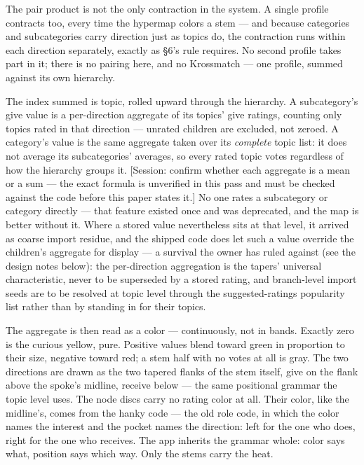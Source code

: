 The pair product is not the only contraction in the system. A single
profile contracts too, every time the hypermap colors a stem --- and
because categories and subcategories carry direction just as topics do,
the contraction runs within each direction separately, exactly as \S 6's
rule requires. No second profile takes part in it; there is no pairing
here, and no Krossmatch --- one profile, summed against its own
hierarchy.

The index summed is topic, rolled upward through the hierarchy. A
subcategory's give value is a per-direction aggregate of its topics'
give ratings, counting only topics rated in that direction --- unrated
children are excluded, not zeroed. A category's value is the same
aggregate taken over its \emph{complete} topic list: it does not average
its subcategories' averages, so every rated topic votes regardless of
how the hierarchy groups it. {[}Session: confirm whether each aggregate
is a mean or a sum --- the exact formula is unverified in this pass and
must be checked against the code before this paper states it.{]} No one
rates a subcategory or category directly --- that feature existed once
and was deprecated, and the map is better without it. Where a stored
value nevertheless sits at that level, it arrived as coarse import
residue, and the shipped code does let such a value override the
children's aggregate for display --- a survival the owner has ruled
against (see the design notes below): the per-direction aggregation is
the tapers' universal characteristic, never to be superseded by a stored
rating, and branch-level import seeds are to be resolved at topic level
through the suggested-ratings popularity list rather than by standing in
for their topics.

The aggregate is then read as a color --- continuously, not in bands.
Exactly zero is the curious yellow, pure. Positive values blend toward
green in proportion to their size, negative toward red; a stem half with
no votes at all is gray. The two directions are drawn as the two tapered
flanks of the stem itself, give on the flank above the spoke's midline,
receive below --- the same positional grammar the topic level uses. The
node discs carry no rating color at all. Their color, like the
midline's, comes from the hanky code --- the old role code, in which the
color names the interest and the pocket names the direction: left for
the one who does, right for the one who receives. The app inherits the
grammar whole: color says what, position says which way. Only the stems
carry the heat.

